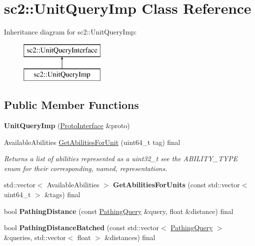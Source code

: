 \hypertarget{classsc2_1_1_unit_query_imp}{}\section{sc2\+:\+:Unit\+Query\+Imp Class Reference}
\label{classsc2_1_1_unit_query_imp}
Inheritance diagram for sc2\+:\+:Unit\+Query\+Imp\+:\begin{figure}[H]
\begin{center}
\leavevmode
\includegraphics[height=2.000000cm]{classsc2_1_1_unit_query_imp}
\end{center}
\end{figure}
\subsection*{Public Member Functions}
\begin{DoxyCompactItemize}
\item 
\mbox{\label{classsc2_1_1_unit_query_imp_a51f3788c248858ae091b6c9d02795b28}} 
{\bfseries Unit\+Query\+Imp} (\hyperlink{classsc2_1_1_proto_interface}{Proto\+Interface} \&proto)
\item 
\mbox{\label{classsc2_1_1_unit_query_imp_aa34b1ee99345571080930b4d98649599}} 
Available\+Abilities \hyperlink{classsc2_1_1_unit_query_imp_aa34b1ee99345571080930b4d98649599}{Get\+Abilities\+For\+Unit} (uint64\+\_\+t tag) final
\begin{DoxyCompactList}\small\item\em Returns a list of abilities represented as a uint32\+\_\+t see the A\+B\+I\+L\+I\+T\+Y\+\_\+\+T\+Y\+PE enum for their corresponding, named, representations. \end{DoxyCompactList}\item 
\mbox{\label{classsc2_1_1_unit_query_imp_afee99c4a81535ca39884eb4fdca284af}} 
std\+::vector$<$ Available\+Abilities $>$ {\bfseries Get\+Abilities\+For\+Units} (const std\+::vector$<$ uint64\+\_\+t $>$ \&tags) final
\item 
\mbox{\label{classsc2_1_1_unit_query_imp_a10e0064cf298395f3c6b63a4ef0f6fbc}} 
bool {\bfseries Pathing\+Distance} (const \hyperlink{structsc2_1_1_unit_query_interface_1_1_pathing_query}{Pathing\+Query} \&query, float \&distance) final
\item 
\mbox{\label{classsc2_1_1_unit_query_imp_a9a2ed50ae9a565f062e3f19113177bc1}} 
bool {\bfseries Pathing\+Distance\+Batched} (const std\+::vector$<$ \hyperlink{structsc2_1_1_unit_query_interface_1_1_pathing_query}{Pathing\+Query} $>$ \&queries, std\+::vector$<$ float $>$ \&distances) final
\end{DoxyCompactItemize}
